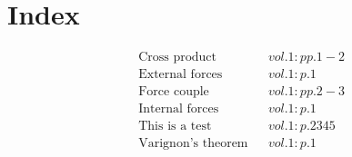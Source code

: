 \documentclass[a4paper]{article}
\begin{document}
 
\section*{Index} 
\begin{align*} 
&\text{Cross product}&& vol. 1: pp. 1-2\\
&\text{External forces}&& vol. 1: p. 1\\
&\text{Force couple}&& vol. 1: pp. 2-3\\
&\text{Internal forces}&& vol. 1: p. 1\\
&\text{This is a test}&& vol. 1: p. 2345\\
&\text{Varignon's theorem}&& vol. 1: p. 1\\
\end{align*} 
\end{document}
